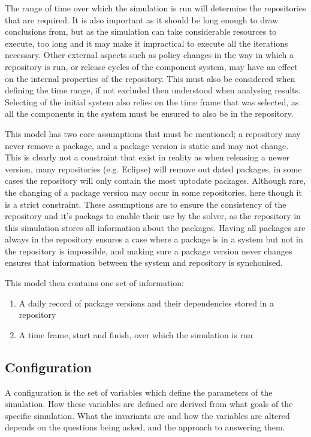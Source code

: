 The range of time over which the simulation is run will determine the repositories that are required.
It is also important as it should be long enough to draw conclusions from,
but as the simulation can take considerable resources to execute, too long and it may make it impractical to execute all the iterations necessary.
Other external aspects such as policy changes in the way in which a repository is run, or release cycles of the component system, 
may have an effect on the internal properties of the repository.
This must also be considered when defining the time range, if not excluded then understood when analysing results.
Selecting of the initial system also relies on the time frame that was selected,
as all the components in the system must be ensured to also be in the repository.

This model has two core assumptions that must be mentioned; a repository may never remove a package, and a package version is static and may not change.
This is clearly not a constraint that exist in reality as when releasing a newer version, many repositories (e.g. Eclipse) will remove out dated packages,
in some cases the repository will only contain the most uptodate packages.
Although rare, the changing of a package version may occur in some repositories, here though it is a strict constraint.
These assumptions are to ensure the consistency of the repository and it's packags to enable their use by the solver, 
as the repository in this simulation stores all information about the packages.
Having all packages are always in the repository ensures a case where a package is in a system but not in the repository is impossible,
and making sure a package version never changes ensures that information between the system and repository is synchonised.  

This model then contains one set of information:
\begin{enumerate}
  \item A daily record of package versions and their dependencies stored in a repository
  \item A time frame, start and finish, over which the simulation is run
\end{enumerate}

\subsection{Configuration}
A configuration is the set of variables which define the parameters of the simulation.
How these variables are defined are derived from what goals of the specific simulation.
What the invariants are and how the variables are altered depends on the questions being asked, and the approach to answering them.

